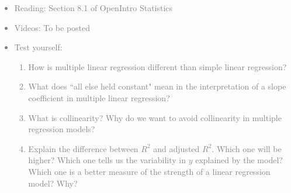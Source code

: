 \documentclass[11pt]{article}
\newcommand{\gray}[1]{\textcolor{gray}{#1}}
\begin{document}
\gray{
{\it
\vspace{-0.55cm}
\begin{itemize}
\renewcommand{\labelitemi}{{\textcolor{dark}{$\ast$}}}
\item Reading: Section 8.1 of OpenIntro Statistics
\item Videos: To be posted
\item Test yourself:
\begin{enumerate}
\item How is multiple linear regression different than simple linear regression?
\item What does ``all else held constant" mean in the interpretation of a slope coefficient in multiple linear regression?
\item What is collinearity? Why do we want to avoid collinearity in multiple regression models?
\item Explain the difference between $R^2$ and adjusted $R^2$. Which one will be higher? Which one tells us the variability in $y$ explained by the model? Which one is a better measure of the strength of a linear regression model? Why?
\end{enumerate}
\end{itemize}
}}

%

\vspace{0.48cm}
\end{document}
